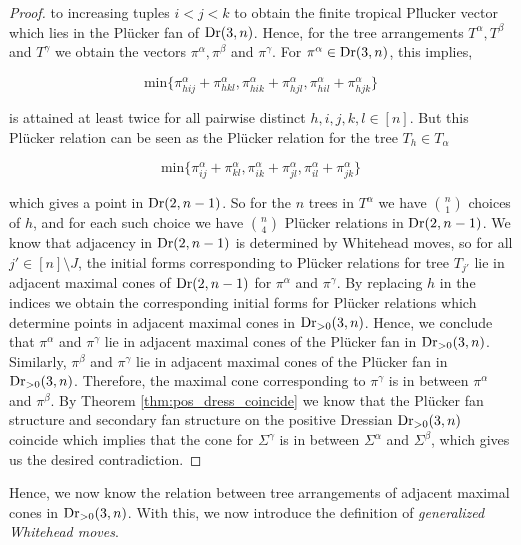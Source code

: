 \documentclass[12pt]{article}
\DeclareMathOperator{\Dr}{\rm Dr}
\theoremstyle{plain}
\theoremstyle{definition}
\numberwithin{subcase}{case}
\begin{document}
\begin{proof}
to increasing tuples $i <j < k$ to obtain the finite tropical Pl\"lucker vector which lies in the Pl\"ucker fan of $\Dr(3,n)$. Hence, for the tree arrangements $T^{\alpha}, T^{\beta}$ and $T^{\gamma}$ we obtain the vectors $\pi^{\alpha}, \pi^{\beta}$ and $\pi^{\gamma}$. For $\pi^{\alpha} \in \Dr(3,n)$, this implies,

\[\text{min}\{\pi^{\alpha}_{hij} + \pi^{\alpha}_{hkl}, \pi^{\alpha}_{hik} + \pi^{\alpha}_{hjl}, \pi^{\alpha}_{hil} + \pi^{\alpha}_{hjk}  \} \]

is attained at least twice for all pairwise distinct $h,i,j,k,l \in [n]$. But this Pl\"ucker relation can be seen as the Pl\"ucker relation for the tree $T_{h} \in T_{\alpha}$

\[ \text{min} \{\pi^{\alpha}_{ij} + \pi^{\alpha}_{kl}, \pi^{\alpha}_{ik} + \pi^{\alpha}_{jl}, \pi^{\alpha}_{il} + \pi^{\alpha}_{jk}  \} \]

which gives a point in $\Dr(2,n-1)$. So for the $n$ trees in $T^{\alpha}$ we have $\binom{n}{1}$ choices of $h$, and for each such choice we have $\binom{n}{4}$ Pl\"ucker relations in $\Dr(2,n-1)$.  We know that adjacency in $\Dr(2,n-1)$ is determined by Whitehead moves, so for all $j' \in [n] \setminus J$, the initial forms corresponding to Pl\"ucker relations for tree $T_{j'}$ lie in adjacent maximal cones of $\Dr(2,n-1)$ for $\pi^{\alpha}$ and $\pi^{\gamma}$. By replacing $h$ in the indices we obtain the corresponding initial forms for Pl\"ucker relations which determine points in adjacent maximal cones in $\Dr_{> 0}(3,n)$. Hence, we conclude that $\pi^{\alpha}$ and $\pi^{\gamma}$ lie in adjacent maximal cones of the Pl\"ucker fan in $\Dr_{> 0}(3,n)$. Similarly, $\pi^{\beta}$ and $\pi^{\gamma}$ lie in adjacent maximal cones of the Pl\"ucker fan in $\Dr_{> 0}(3,n)$. Therefore, the maximal cone corresponding to $\pi^{\gamma}$ is in between $\pi^{\alpha}$ and $\pi^{\beta}$. By Theorem \ref{thm:pos_dress_coincide} we know that the Pl\"ucker fan structure and secondary fan structure on the positive Dressian $\Dr_{> 0}(3,n)$ coincide which implies that the cone for $\Sigma^{\gamma}$ is in between $\Sigma^{\alpha}$ and $\Sigma^{\beta}$, which gives us the desired contradiction.

\end{proof}

Hence, we now know the relation between tree arrangements of adjacent maximal cones in $\Dr_{>0}(3,n)$. With this, we now introduce the definition of \emph{generalized Whitehead moves}. 
\end{document}

